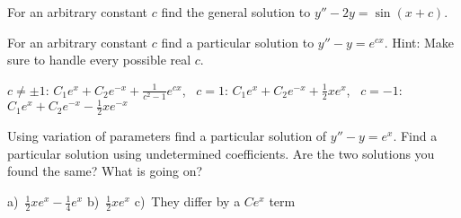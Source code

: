 \begin{exercise}
For an arbitrary constant $c$ find the general solution
to $y''-2y=\sin(x+c)$.
\end{exercise}

\begin{exercise}
For an arbitrary constant $c$ find a particular solution
to $y''-y=e^{cx}$.  Hint: Make sure to handle every possible real $c$.
\end{exercise}
\comboSol{%
}
{%
$c\neq \pm1$: $C_1e^x + C_2e^{-x} + \frac{1}{c^2 - 1}e^{cx}$, \ $c=1$: $C_1e^x + C_2e^{-x} + \frac{1}{2}xe^x$, \ $c=-1$: $C_1e^x + C_2e^{-x} - \frac{1}{2}xe^{-x}$
}

\begin{exercise} \label{exercise:diffvarparunder}
\pagebreak[2]
\leavevmode
\begin{tasks}
\task Using variation of parameters find a particular solution of
$y''-y = e^x$.
\task Find a particular solution using undetermined
coefficients.
\task Are the two solutions you found the same?
What is going on?
\end{tasks}
\end{exercise}
\comboSol{%
}
{%
a)~$\frac{1}{2}xe^x - \frac{1}{4}e^x$ \quad b)~$\frac{1}{2}xe^x$ \quad c)~They differ by a $Ce^x$ term
}

\setcounter{exercise}{100}
